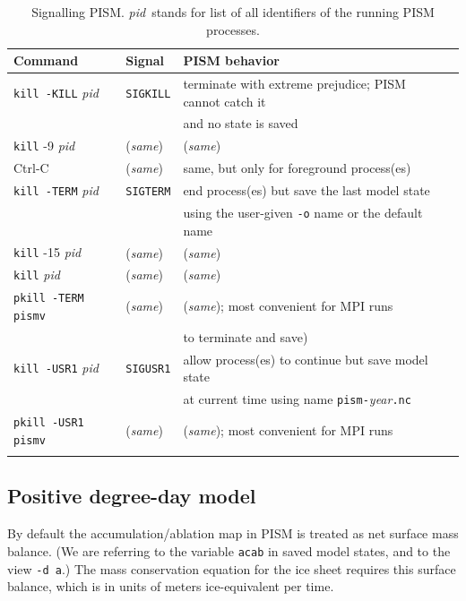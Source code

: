 \documentclass[11pt,final]{amsart}
\begin{document}
\newcommand\pid{\textsl{pid}}
\newcommand\same{(\textsl{same})}
\begin{table}[ht]
\caption{Signalling PISM.  \pid~stands for list of all identifiers of the running PISM processes.}\label{tab:signals}
\begin{tabular}{@{}llll}\hline
\textbf{Command}\phantom{bobbob} & \textbf{Signal}\phantom{bobbob} & \textbf{PISM behavior} \\ \hline
\texttt{kill -KILL} \pid & \texttt{SIGKILL} & terminate with extreme prejudice; PISM cannot catch it \\
 & & and no state is saved \\
\texttt{kill} -9 \pid & \same & \same \\
Ctrl-C & \same & same, but only for foreground process(es)  \\ \hline
\texttt{kill -TERM} \pid & \texttt{SIGTERM} & end process(es) but save the last model state \\
 &  & using the user-given \verb|-o| name or the default name \\
\texttt{kill} -15 \pid & \same & \same \\
\texttt{kill} \pid & \same & \same \\
\texttt{pkill -TERM pismv} & \same & \same; most convenient for MPI runs \\ 
 &  & to terminate and save) \\ \hline
\texttt{kill -USR1} \pid & \texttt{SIGUSR1} & allow process(es) to continue but save model state \\
 &  & at current time using name \texttt{pism-}\textsl{year}\texttt{.nc} \\
\texttt{pkill -USR1 pismv} & \same & \same; most convenient for MPI runs \\
\hline\normalsize
\end{tabular}
\end{table}


\subsection{Positive degree-day model}  \label{subsect:pdd}     By default the accumulation/ablation map in PISM is treated as net surface mass balance.  (We are referring to the variable \verb|acab| in saved model states, and to the view \verb|-d a|.)  The mass conservation equation for the ice sheet requires this surface balance, which is in units of meters ice-equivalent per time.
\end{document}
